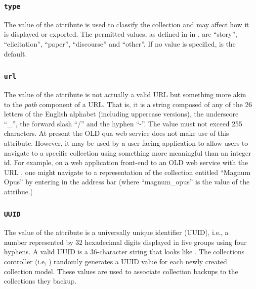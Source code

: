 \documentclass[letterpaper,10pt,english]{sphinxmanual}
\begin{document}
\subsubsection{\texttt{type}}
\label{datastructure:type}
The value of the  attribute is used to classify the collection and may
affect how it is displayed or exported.  The permitted values, as defined in
 in , are ``story'', ``elicitation'', ``paper'',
``discourse'' and ``other''.  If no value is specified,  is the default.


\subsubsection{\texttt{url}}
\label{datastructure:url}
The value of the  attribute is not actually a valid URL but something
more akin to the \emph{path} component of a URL.  That is, it is a string composed of
any of the 26 letters of the English alphabet (including uppercase versions),
the underscore ``\_'', the forward slash ``/'' and the hyphen ``-''.  The  value
must not exceed 255 characters.  At present the OLD qua web service does not
make use of this attribute.  However, it may be used by a user-facing
application to allow users to navigate to a specific collection using something
more meaningful than an integer id.  For example, on a web application front-end
to an OLD web service with the URL , one might
navigate to a representation of the collection entitled ``Magnum Opus'' by
entering  in the address bar (where
``magnum\_opus'' is the value of the  attribue.)


\subsubsection{\texttt{UUID}}
\label{datastructure:uuid}
The value of the  attribute is a universally unique identifier (UUID),
i.e., a number represented by 32 hexadecimal digits displayed in five groups
using four hyphens.  A valid UUID is a 36-character string that looks like
.  The collections controller (i.e,
) randomly generates a UUID value for each newly created
collection model.  These values are used to associate collection backups to the
collections they backup.
\end{document}
